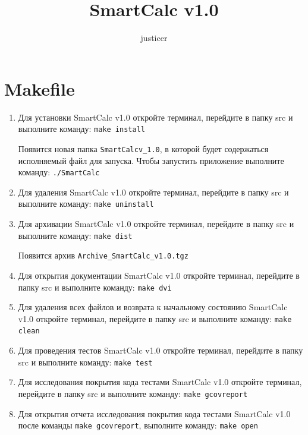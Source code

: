 \documentclass[12pt, letterpaper, twoside]{article}
\title{SmartCalc v1.0}
\author{justicer}
\newcommand{\code}[1]{\texttt{#1}}
\begin{document}
	
	\maketitle
	
	\section{Makefile}
	\begin{enumerate}
		\item Для установки SmartCalc v1.0 откройте терминал, перейдите в папку src и выполните команду: \code{make install} \par  Появится новая папка \verb|SmartCalcv_1.0|, в которой будет содержаться исполняемый файл для запуска. Чтобы запустить приложение выполните команду: \code{./SmartCalc}
		\item Для удаления SmartCalc v1.0 откройте терминал, перейдите в папку src и выполните команду: \code{make uninstall}
		\item Для архивации SmartCalc v1.0 откройте терминал, перейдите в папку src и выполните команду: \code{make dist}  \par  Появится архив \verb|Archive_SmartCalc_v1.0.tgz|
		\item Для открытия документации SmartCalc v1.0 откройте терминал, перейдите в папку src и выполните команду: \code{make dvi}
		\item Для удаления всех файлов и возврата к начальному состоянию SmartCalc v1.0 откройте терминал, перейдите в папку src и выполните команду: \code{make clean}
		\item Для проведения тестов SmartCalc v1.0 откройте терминал, перейдите в папку src и выполните команду: \code{make test}
		\item Для исследования покрытия кода тестами SmartCalc v1.0 откройте терминал, перейдите в папку src и выполните команду: \code{make gcov\textunderscore report}
		\item Для открытия отчета исследования покрытия кода тестами SmartCalc v1.0 после команды  \code{make gcov\textunderscore report}, выполните команду: \code{make open}
	\end{enumerate}
\end{document}
